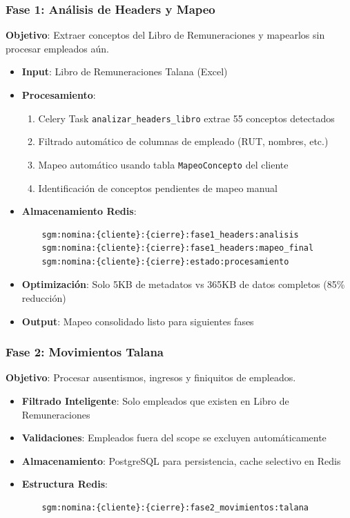 \subsubsection{Fase 1: Análisis de Headers y Mapeo}

\textbf{Objetivo}: Extraer conceptos del Libro de Remuneraciones y mapearlos sin procesar empleados aún.

\begin{itemize}
    \item \textbf{Input}: Libro de Remuneraciones Talana (Excel)
    \item \textbf{Procesamiento}:
    \begin{enumerate}
        \item Celery Task \texttt{analizar\_headers\_libro} extrae 55 conceptos detectados
        \item Filtrado automático de columnas de empleado (RUT, nombres, etc.)
        \item Mapeo automático usando tabla \texttt{MapeoConcepto} del cliente
        \item Identificación de conceptos pendientes de mapeo manual
    \end{enumerate}
    \item \textbf{Almacenamiento Redis}:
    \begin{verbatim}
    sgm:nomina:{cliente}:{cierre}:fase1_headers:analisis
    sgm:nomina:{cliente}:{cierre}:fase1_headers:mapeo_final
    sgm:nomina:{cliente}:{cierre}:estado:procesamiento
    \end{verbatim}
    \item \textbf{Optimización}: Solo 5KB de metadatos vs 365KB de datos completos (85\% reducción)
    \item \textbf{Output}: Mapeo consolidado listo para siguientes fases
\end{itemize}

\subsubsection{Fase 2: Movimientos Talana}

\textbf{Objetivo}: Procesar ausentismos, ingresos y finiquitos de empleados.

\begin{itemize}
    \item \textbf{Filtrado Inteligente}: Solo empleados que existen en Libro de Remuneraciones
    \item \textbf{Validaciones}: Empleados fuera del scope se excluyen automáticamente
    \item \textbf{Almacenamiento}: PostgreSQL para persistencia, cache selectivo en Redis
    \item \textbf{Estructura Redis}:
    \begin{verbatim}
    sgm:nomina:{cliente}:{cierre}:fase2_movimientos:talana
    \end{verbatim}
\end{itemize}


